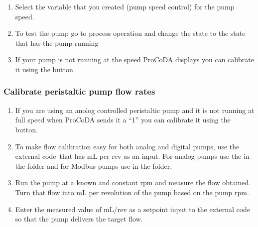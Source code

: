 \documentclass[letterpaper,10pt,english]{sphinxmanual}
\begin{document}
\begin{description}
\begin{enumerate}
\item {} 
Select the variable that you created (pump speed control) for the pump speed.

\item {} 
To test the pump go to process operation and change the state to the state that has the pump running

\item {} 
If your pump is not running at the speed ProCoDA displays you can calibrate it using the  button

\end{enumerate}

\end{description}


\subsubsection{Calibrate peristaltic pump flow rates}
\label{\detokenize{ProCoDA/ProCoDA:calibrate-peristaltic-pump-flow-rates}}\begin{enumerate}
\item {} 
If you are using an anolog controlled peristaltic pump and it is not running at full speed when ProCoDA sends it a “1” you can calibrate it using the  button.

\item {} 
To make flow calibration easy for both analog and digital pumps, use the external code that has mL per rev as an input. For analog pumps use the  in the  folder and for Modbus pumps use  in the  folder.

\item {} 
Run the pump at a known and constant rpm and measure the flow obtained. Turn that flow into mL per revolution of the pump based on the pump rpm.

\item {} 
Enter the measured value of mL/rev as a setpoint input to the external code so that the pump delivers the target flow.

\end{enumerate}
\end{document}

